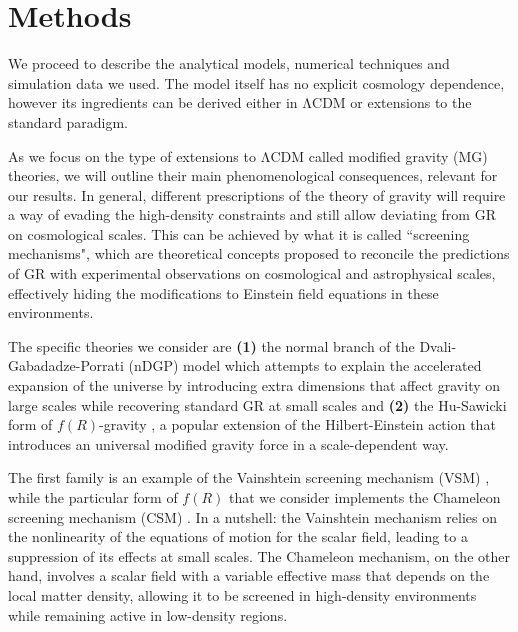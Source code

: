 \documentclass[%
 reprint,
groupedaddress,
nofootinbib,
nobibnotes,
 amsmath,amssymb,
 aps,
]{revtex4-2}
\newcommand{\lcdm}{$\mathrm{\Lambda CDM}$}
\newcommand{\<}{\langle}
\renewcommand{\>}{\rangle}
\begin{document}
\section{\label{sec:methods}Methods}

We proceed to describe the analytical models, numerical techniques and simulation data we used. The model itself has no explicit cosmology dependence, however its ingredients can be derived either in \lcdm{} or extensions to the standard paradigm.

As we focus on the type of extensions to \lcdm{} called modified gravity (MG) theories, we will outline their main phenomenological consequences, relevant for our results. 
In general,  different prescriptions of the theory of gravity will require a way  of evading the high-density constraints and still allow deviating from GR on cosmological scales. This can be achieved  by what it is called ``screening mechanisms", which are theoretical concepts proposed to reconcile the predictions of GR with experimental observations on cosmological and astrophysical scales, effectively  hiding the modifications to Einstein field equations in these environments. 

The specific theories we consider are \textbf{(1)} the normal branch of the Dvali-Gabadadze-Porrati (nDGP) model which attempts to explain the accelerated expansion of the universe by introducing extra dimensions that affect gravity on large scales while recovering standard GR at small scales \cite{ndgp_2000} and \textbf{(2)} the Hu-Sawicki form of $f(R)$-gravity \cite{HS_fR_2007}, a popular extension of the Hilbert-Einstein action that introduces an universal modified gravity force in a scale-dependent way.  

The first family is an example of  the Vainshtein screening mechanism (VSM) \cite{Vainshtein_1972}, while the particular form of $f(R)$ that we consider implements the Chameleon screening mechanism (CSM) \cite{Khoury2003PRD}. In a nutshell: the Vainshtein mechanism relies on the nonlinearity of the equations of motion for the scalar field, leading to a suppression of its effects at small scales. The Chameleon mechanism, on the other hand, involves a scalar field with a variable effective mass that depends on the local matter density, allowing it to be screened in high-density environments while remaining active in low-density regions.
\end{document}
